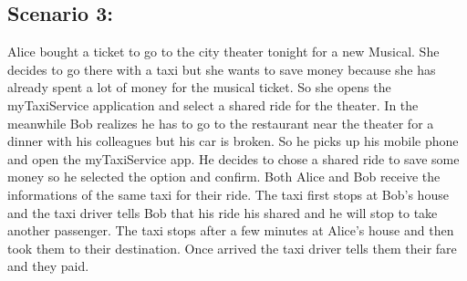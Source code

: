 \subsection{Scenario 3:}
Alice bought a ticket to go to the city theater tonight for a new Musical. She decides to go there with a taxi but she wants to save money because she has already spent a lot of money for the musical ticket. So she opens the myTaxiService application and select a shared ride for the theater.
In the meanwhile Bob realizes he has to go to the restaurant near the theater for a dinner with his colleagues but his car is broken. So he picks up his mobile phone and open the myTaxiService app. He decides to chose a shared ride to save some money so he selected the option and confirm.
Both Alice and Bob receive the informations of the same taxi for their ride. The taxi first stops at Bob's house and the taxi driver tells Bob that his ride his shared and he will stop to take another passenger. The taxi stops after a few minutes at Alice's house and then took them to their destination. Once arrived the taxi driver tells them their fare and they paid.